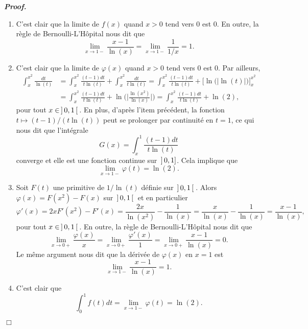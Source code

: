 \documentclass[11pt,a4paper]{article}
\newenvironment{preuve}[1][]
{\vskip 2mm  \noindent\emph{\bf Proof#1. }}{$\Box$ \vskip 2mm}
\begin{document}
	\begin{preuve}
		\begin{enumerate}
			\item C'est clair que la limite de $f(x)$ quand $x>0$ tend vers $0$ est $0$. 
			En outre, la règle de Bernoulli-L'H\^opital nous dit que
			\[     \underset{x \rightarrow 1-}{\lim} \frac{x-1}{\ln(x)} = \underset{x \rightarrow 1-}{\lim} \frac{1}{1/x} = 1.     \]
			
			\item C'est clair que la limite de $\varphi(x)$ quand $x>0$ tend vers $0$ est $0$. 
			Par ailleurs,  
			\begin{equation}
			\label{eq:int}
			\begin{split}
			\int_{x}^{x^{2}} \frac{dt}{\ln(t)} &= \int_{x}^{x^{2}} \frac{(t-1) dt}{t \ln(t)} + \int_{x}^{x^{2}} \frac{dt}{t \ln(t)} 
			= \int_{x}^{x^{2}} \frac{(t-1) dt}{t \ln(t)} + \bigg[ \ln\big(\big|\ln(t)\big|\big) \bigg]_{x}^{x^{2}}
			\\
			&= \int_{x}^{x^{2}} \frac{(t-1) dt}{t \ln(t)} + \ln\bigg(\bigg|\frac{\ln(x^{2})}{\ln(x)}\bigg|\bigg) = \int_{x}^{x^{2}} \frac{(t-1) dt}{t \ln(t)} + \ln(2), 
			\end{split}
			\end{equation} 
			pour tout $x \in \hskip 0.6mm ] \hskip 0.6mm 0,1 \hskip 0.6mm [ \hskip 0.6mm$. 
			En plus, d'après l'item précédent, la fonction $t \mapsto (t-1)/(t \ln(t))$ peut se prolonger par continuité en $t = 1$, ce qui nous dit que l'intégrale 
			\[     G(x) = \int_{x}^{1} \frac{(t-1) dt}{t \ln(t)}     \]
			converge et elle est une fonction continue sur $\hskip 0.6mm ] \hskip 0.6mm 0,1 ]$. 
			Cela implique que  
			\[     \underset{x \rightarrow 1-}{\lim} \varphi(t) = \ln(2).     \]
			
			\item Soit $F(t)$ une primitive de $1/\ln(t)$ définie sur $\hskip 0.6mm ] \hskip 0.6mm 0,1 \hskip 0.6mm [ \hskip 0.6mm$. 
			Alors $\varphi(x) = F(x^{2}) - F(x)$ sur $\hskip 0.6mm ] \hskip 0.6mm 0,1 \hskip 0.6mm [ \hskip 0.6mm$ et en particulier 
			\[     \varphi'(x) = 2x F'(x^{2}) - F'(x) = \frac{2x}{\ln(x^{2})} - \frac{1}{\ln(x)} = \frac{x}{\ln(x)} - \frac{1}{\ln(x)} = \frac{x-1}{\ln(x)},     \] 
			pour tout $x \in \hskip 0.6mm ] \hskip 0.6mm 0,1 \hskip 0.6mm [ \hskip 0.6mm$. 
			En outre, la règle de Bernoulli-L'H\^opital nous dit que 
			\[     \underset{x \rightarrow 0+}{\lim} \frac{\varphi(x)}{x} = \underset{x \rightarrow 0+}{\lim} \frac{\varphi'(x)}{1} = \underset{x \rightarrow 0+}{\lim} \frac{x-1}{\ln(x)} = 0.     \]
			Le même argument nous dit que la dérivée de $\varphi(x)$ en $x=1$ est 
			\[     \underset{x \rightarrow 1-}{\lim} \frac{x-1}{\ln(x)} = 1.     \]
			
			\item C'est clair que 
			\[     \int_0^1f(t) dt = \underset{x \rightarrow 1-}{\lim} \varphi(t) = \ln(2).     \]
		\end{enumerate}
	\end{preuve}
	
\end{document}
